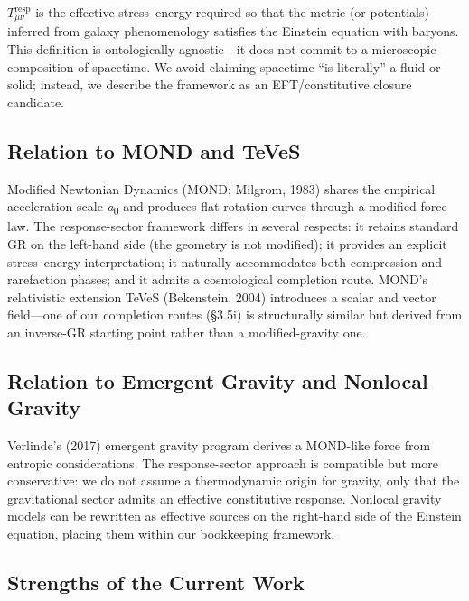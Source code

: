 \documentclass[11pt]{article}
\begin{document}
\(T_{\mu\nu}^{\text{resp}}\) is the effective stress--energy required so that the metric (or potentials) inferred from galaxy phenomenology satisfies the Einstein equation with baryons. This definition is ontologically agnostic---it does not commit to a microscopic composition of spacetime. We avoid claiming spacetime ``is literally'' a fluid or solid; instead, we describe the framework as an EFT/constitutive closure candidate.

\subsection{Relation to MOND and TeVeS}\label{relation-to-mond-and-teves}

Modified Newtonian Dynamics (MOND; Milgrom, 1983) shares the empirical acceleration scale \emph{a}\textsubscript{0} and produces flat rotation curves through a modified force law. \citep{PoissonWill2014, Wald1984GR, Carroll2019Spacetime} The response-sector framework differs in several respects: it retains standard GR on the left-hand side (the geometry is not modified); it provides an explicit stress--energy interpretation; it naturally accommodates both compression and rarefaction phases; and it admits a cosmological completion route. MOND's relativistic extension TeVeS (Bekenstein, 2004) introduces a scalar and vector field---one of our completion routes (§3.5i) is structurally similar but derived from an inverse-GR starting point rather than a modified-gravity one.

\subsection{Relation to Emergent Gravity and Nonlocal Gravity}\label{relation-to-emergent-gravity-and-nonlocal-gravity}

Verlinde's (2017) emergent gravity program derives a MOND-like force from entropic considerations. The response-sector approach is compatible but more conservative: we do not assume a thermodynamic origin for gravity, only that the gravitational sector admits an effective constitutive response. Nonlocal gravity models \citep{DeserWoodard2007Nonlocal, Rasanen2006Backreaction} can be rewritten as effective sources on the right-hand side of the Einstein equation, placing them within our bookkeeping framework.

\subsection{Strengths of the Current Work}\label{strengths-of-the-current-work}
\end{document}
